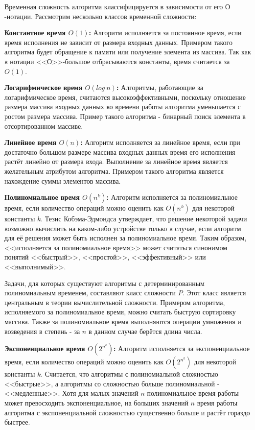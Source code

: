 \documentclass[times,specification,annotation]{itmo-student-thesis}
\begin{document}
Временная сложность алгоритма классифицируется в зависимости от его $\textit{О}$-нотации.
Рассмотрим нескольно классов временной сложности:

\textbf{Константное время $O(1)$:}
Алгоритм исполняется за постоянное время,
если время исполнения не зависит от размера входных данных.
Примером такого алгоритма будет обращение к памяти или получение элемента из массива.
Так как в нотации <<$\textit{О}$>>-большое отбрасываются константы, время считается за $O(1)$.

\textbf{Логарифмическое время $O(log~n)$:}
Алгоритмы, работающие за логарифмическое время, считаются высокоэффективными, поскольку
отношение размера массива входных данных ко времени работы алгоритма уменьшается с ростом размера массива.
Пример такого алгоритма - бинарный поиск элемента в отсортированном массиве.

\textbf{Линейное время $O(n)$:}
Алгоритм исполняется за линейное время, если при достаточно большом размере массива входных данных
время его исполнения растёт линейно от размера входа.
Выполнение за линейное время является желательным атрибутом алгоритма.
Примером такого алгоритма является нахождение суммы элементов массива.

\textbf{Полиномиальное время $O(n^k)$:}
Алгоритм исполняется за полиномиальное время, если количество операций можно оценить как $O(n^k)$ для некоторой константы $k$.
Тезис Кобэма-Эдмондса утверждает, что решение некоторой задачи возможно вычислить на каком-либо устройстве только в случае,
если алгоритм для её решения может быть исполнен за полиномиальное время.
Таким образом, <<исполняется за полиномиальное время>> может считаться синонимом понятий <<быстрый>>, <<простой>>, <<эффективный>>
или <<выполнимый>>.

Задачи, для которых существуют алгоритмы с детерминированным полиномиальным временем, составляют класс сложности $P$.
Этот класс является центральным в теории вычислительной сложности.
Примером алгоритма, исполняемого за полиномиальное время, можно считать быструю сортировку массива.
Также за полиномиальное время выполняются операции умножения и возведения в степень - за $n$ в данном случае
берётся длина числа.

\textbf{Экспоненциальное время $O(2^{n^k})$:}
Алгоритм исполняется за экспоненциальное время, если количество операций можно оценить как $O(2^{n^k})$ для некоторой константы $k$.
Считается, что алгоритмы с полиномиальной сложностью <<быстрые>>, а алгоритмы со сложностью больше полиномиальной - <<медленные>>.
Хотя для малых значений $n$ полиномиальное время работы может превосходить экспоненциальное, на больших
значений $n$ время работы алгоритма с экспоненциальной сложностью существенно больше и растёт гораздо
быстрее.
\end{document}
